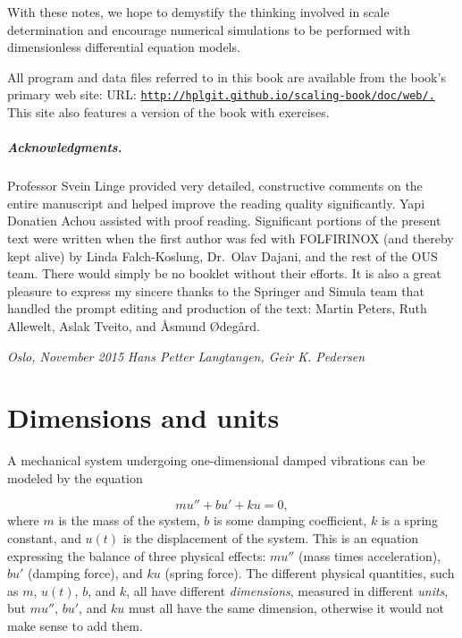 \documentclass[graybox,envcountchap,sectrefs,final]{svmonodo}
\begin{document}
With these notes, we hope to demystify the thinking involved in scale
determination and encourage numerical simulations to be performed with
dimensionless differential equation models.

All program and data files referred to in this book are available
from the book's primary web site:
URL: \href{{http://hplgit.github.io/scaling-book/doc/web/.}}{\nolinkurl{http://hplgit.github.io/scaling-book/doc/web/.}}
This site also features a version of the book with exercises.

\paragraph{Acknowledgments.}
Professor Svein Linge
provided very detailed, constructive comments on the entire manuscript
and helped improve the reading quality significantly.
Yapi Donatien Achou assisted with proof reading.
Significant portions of
the present text were written when the first author was fed with
FOLFIRINOX (and thereby kept alive) by Linda Falch-Koslung, Dr.~Olav
Dajani, and the rest of the OUS team. There would simply be no booklet
without their efforts. It is also a great pleasure to express my
sincere thanks to the Springer and Simula team that handled the prompt
editing and production of the text: Martin Peters, Ruth Allewelt,
Aslak Tveito, and Åsmund Ødegård.

\vspace{1cm}

\noindent
{\it Oslo, November 2015}  \hfill  {\it Hans Petter Langtangen, Geir K. Pedersen}



\tableofcontents


\vspace{1cm} %

\mainmatter





\chapter{Dimensions and units}
\label{scale:dimunit}


A mechanical system undergoing one-dimensional damped vibrations can be
modeled by the equation

\begin{equation}
mu'' + bu' + ku = 0,
\label{scale:dimunit:eq:u}
\end{equation}
where $m$ is the mass of the system, $b$ is some damping coefficient,
$k$ is a spring constant, and $u(t)$ is the displacement of the
system.  This is an equation expressing the balance of three physical
effects: $mu''$ (mass times acceleration), $bu'$ (damping force), and
$ku$ (spring force).  The different physical quantities, such as $m$,
$u(t)$, $b$, and $k$, all have different \emph{dimensions}, measured in
different \emph{units}, but $mu''$, $bu'$, and $ku$ must all have the same
dimension, otherwise it would not make sense to add them.
\end{document}
